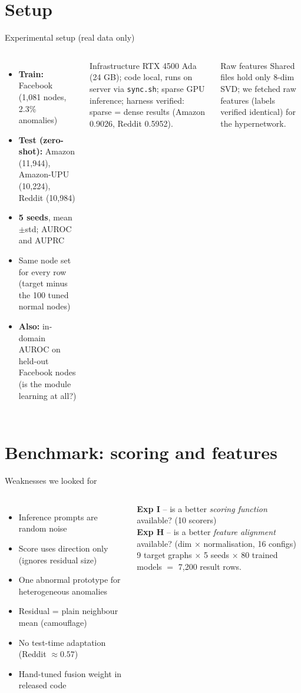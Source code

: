 \documentclass[aspectratio=169,11pt]{beamer}
\begin{document}
\section{Setup}
\begin{frame}{Experimental setup (real data only)}
\begin{columns}[T]
\begin{itemize}
\item \textbf{Train:} Facebook (1,081 nodes, 2.3\% anomalies)
\item \textbf{Test (zero-shot):} Amazon (11,944), Amazon-UPU (10,224), Reddit (10,984)
\item \textbf{5 seeds}, mean$\pm$std; AUROC and AUPRC
\item Same node set for every row (target minus the 100 tuned normal nodes)
\item \textbf{Also:} in-domain AUROC on held-out Facebook nodes (is the module learning at all?)
\end{itemize}
\begin{block}{Infrastructure}
\small RTX 4500 Ada (24 GB); code local, runs on server via \texttt{sync.sh}; sparse GPU inference; harness verified: sparse = dense results (Amazon 0.9026, Reddit 0.5952).
\end{block}
\begin{alertblock}{Raw features}
\small Shared files hold only 8-dim SVD; we fetched raw features (labels verified identical) for the hypernetwork.
\end{alertblock}
\end{columns}
\end{frame}

\section{Benchmark: scoring and features}
\begin{frame}{Weaknesses we looked for}
\begin{columns}[T]
\begin{itemize}
\item[P1] Inference prompts are random noise
\item[P2] Score uses direction only (ignores residual size)
\item[P3] One abnormal prototype for heterogeneous anomalies
\item[P4] Residual = plain neighbour mean (camouflage)
\item[P5] No test-time adaptation (Reddit $\approx0.57$)
\item[P6] Hand-tuned fusion weight in released code
\end{itemize}
\textbf{Exp I} -- is a better \emph{scoring function} available? (10 scorers)\\[4pt]
\textbf{Exp H} -- is a better \emph{feature alignment} available? (dim $\times$ normalisation, 16 configs)\\[4pt]
9 target graphs $\times$ 5 seeds $\times$ 80 trained models $=$ 7,200 result rows.
\end{columns}
\end{frame}
\end{document}
